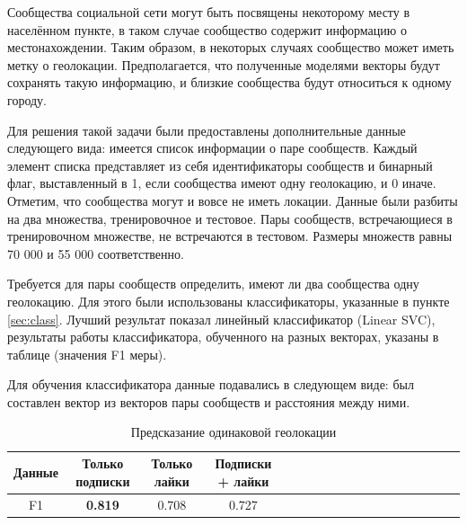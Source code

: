 \documentclass[times,specification,annotation]{itmo-student-thesis}
\begin{document}
Сообщества социальной сети могут быть посвящены некоторому месту в населённом пункте, в таком случае сообщество содержит информацию о местонахождении. Таким образом, в некоторых случаях сообщество может иметь метку о геолокации. Предполагается, что полученные моделями векторы будут сохранять такую информацию, и близкие сообщества будут относиться к одному городу. 

Для решения такой задачи были предоставлены дополнительные данные следующего вида: имеется список информации о паре сообществ. Каждый элемент списка представляет из себя идентификаторы сообществ и бинарный флаг, выставленный в 1, если сообщества имеют одну геолокацию, и 0 иначе. Отметим, что сообщества могут и вовсе не иметь локации. Данные были разбиты на два множества, тренировочное и тестовое. Пары сообществ, встречающиеся в тренировочном множестве, не встречаются в тестовом. Размеры множеств равны 70 000 и 55 000 соответственно.

Требуется для пары сообществ определить, имеют ли два сообщества одну геолокацию. Для этого были использованы классификаторы, указанные в пункте \ref{sec:class}. Лучший результат показал линейный классификатор (Linear SVC), результаты работы классификатора, обученного на разных векторах, указаны в таблице (значения F1 меры). 

Для обучения классификатора данные подавались в следующем виде: был составлен вектор из векторов пары сообществ и расстояния между ними. 


\begin{table}[!h]
\caption{Предсказание одинаковой геолокации} \label{tab2-geo-cmp}
\centering
\begin{tabular}{|*{18}{c|}}\hline
Данные  & Только подписки  & Только лайки & Подписки + лайки \\\hline
F1                        & \textbf{0.819} & 0.708  & 0.727 \\\hline
\end{tabular}
\end{table}
\end{document}

